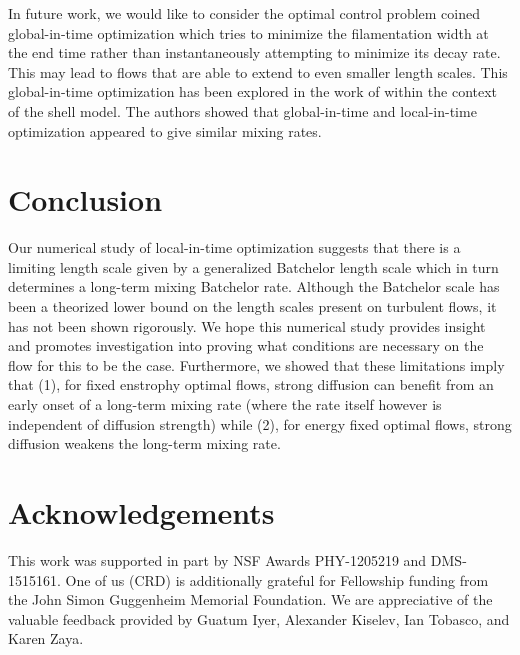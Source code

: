 \documentclass[12pt]{iopart}
\begin{document}
In future work, we would like to consider the optimal control problem coined global-in-time optimization which tries to minimize the filamentation width at the end time rather than instantaneously attempting to minimize its decay rate. This may lead to flows that are able to extend to even smaller length scales. This global-in-time optimization has been explored in the work of \cite{Miles2017a} within the context of the shell model. The authors showed that global-in-time and local-in-time optimization appeared to give similar mixing rates. 


\section{Conclusion}
\label{sec:conclusion}


Our numerical study of local-in-time optimization suggests that there is a limiting length scale given by a generalized Batchelor length scale which in turn determines a long-term mixing Batchelor rate. Although the Batchelor scale has been a theorized lower bound on the length scales present on turbulent flows, it has not been shown rigorously. We hope this numerical study provides insight and promotes investigation into proving what conditions are necessary on the flow for this to be the case. Furthermore, we showed that these limitations imply that (1), for fixed enstrophy optimal flows, strong diffusion can benefit from an early onset of a long-term mixing rate (where the rate itself however is independent of diffusion strength) while (2), for energy fixed optimal flows, strong diffusion weakens the long-term mixing rate.  


\section*{Acknowledgements}

This work was supported in part by NSF Awards PHY-1205219 and DMS-1515161. One of us (CRD) is additionally grateful for Fellowship funding from the John Simon Guggenheim Memorial Foundation. We are appreciative of the valuable feedback provided by Guatum Iyer, Alexander Kiselev, Ian Tobasco, and Karen Zaya.

 

\end{document}

